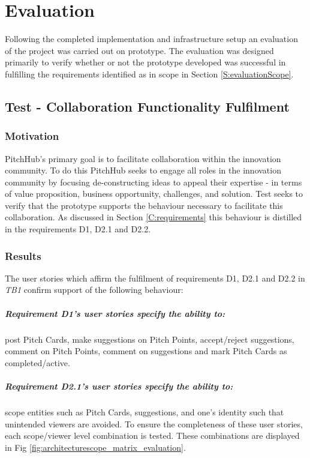 \chapter{Evaluation}
Following the completed implementation and infrastructure setup an evaluation of the project was carried out on prototype. The evaluation was designed primarily to verify whether or not the prototype developed was successful in fulfilling the requirements identified as in scope in Section \ref{S:evaluationScope}.

\section{Test  - Collaboration Functionality Fulfilment}

\subsection{Motivation}
PitchHub's primary goal is to facilitate collaboration within the innovation community. To do this PitchHub seeks to engage all roles in the innovation community by focusing de-constructing ideas to appeal their expertise - in terms of  value proposition, business opportunity, challenges, and solution. Test  seeks to verify that the prototype supports the behaviour necessary to facilitate this collaboration. As discussed in Section \ref{C:requirements} this behaviour is distilled in the requirements D1, D2.1 and D2.2.

\subsection{Results}
The user stories which affirm the fulfilment of requirements D1, D2.1 and D2.2 in \textit{TB1} confirm support of the following behaviour:

\paragraph{Requirement D1's user stories specify the ability to:} post Pitch Cards, make suggestions on Pitch Points, accept/reject suggestions, comment on Pitch Points, comment on suggestions and mark Pitch Cards as completed/active.

\paragraph{Requirement D2.1's user stories specify the ability to:} scope entities such as Pitch Cards, suggestions, and one's identity such that unintended viewers are avoided. To ensure the completeness of these user stories, each scope/viewer level combination is tested. These combinations are displayed in Fig \ref{fig:architecturescope_matrix_evaluation}.

